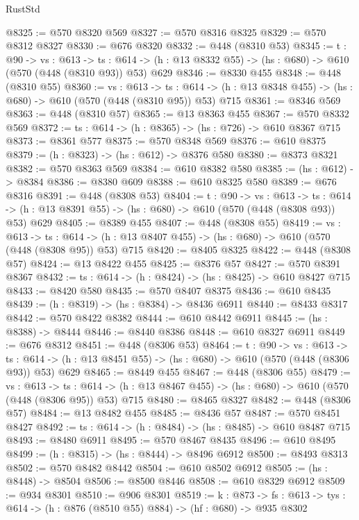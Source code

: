 \begin{lexlean}{RustStd}
\begin{coremodule}
@8325 := @570 @8320 @569
@8327 := @570 @8316 @8325
@8329 := @570 @8312 @8327
@8330 := @676 @8320
@8332 := @448 (@8310 @53)
@8345 := {t : @90} ->
  {vs : @613} ->
  {ts : @614} -> (h : @13 @8332 @55) -> (hs : @680) -> @610 (@570 (@448 (@8310 @93)) @53) @629
@8346 := @8330 @455
@8348 := @448 (@8310 @55)
@8360 := {vs : @613} ->
  {ts : @614} -> (h : @13 @8348 @455) -> (hs : @680) -> @610 (@570 (@448 (@8310 @95)) @53) @715
@8361 := @8346 @569
@8363 := @448 (@8310 @57)
@8365 := @13 @8363 @455
@8367 := @570 @8332 @569
@8372 := {ts : @614} -> (h : @8365) -> (hs : @726) -> @610 @8367 @715
@8373 := @8361 @577
@8375 := @570 @8348 @569
@8376 := @610 @8375
@8379 := (h : @8323) -> (hs : @612) -> @8376 @580
@8380 := @8373 @8321
@8382 := @570 @8363 @569
@8384 := @610 @8382 @580
@8385 := (hs : @612) -> @8384
@8386 := @8380 @609
@8388 := @610 @8325 @580
@8389 := @676 @8316
@8391 := @448 (@8308 @53)
@8404 := {t : @90} ->
  {vs : @613} ->
  {ts : @614} -> (h : @13 @8391 @55) -> (hs : @680) -> @610 (@570 (@448 (@8308 @93)) @53) @629
@8405 := @8389 @455
@8407 := @448 (@8308 @55)
@8419 := {vs : @613} ->
  {ts : @614} -> (h : @13 @8407 @455) -> (hs : @680) -> @610 (@570 (@448 (@8308 @95)) @53) @715
@8420 := @8405 @8325
@8422 := @448 (@8308 @57)
@8424 := @13 @8422 @455
@8425 := @8376 @57
@8427 := @570 @8391 @8367
@8432 := {ts : @614} -> (h : @8424) -> (hs : @8425) -> @610 @8427 @715
@8433 := @8420 @580
@8435 := @570 @8407 @8375
@8436 := @610 @8435
@8439 := (h : @8319) -> (hs : @8384) -> @8436 @6911
@8440 := @8433 @8317
@8442 := @570 @8422 @8382
@8444 := @610 @8442 @6911
@8445 := (hs : @8388) -> @8444
@8446 := @8440 @8386
@8448 := @610 @8327 @6911
@8449 := @676 @8312
@8451 := @448 (@8306 @53)
@8464 := {t : @90} ->
  {vs : @613} ->
  {ts : @614} -> (h : @13 @8451 @55) -> (hs : @680) -> @610 (@570 (@448 (@8306 @93)) @53) @629
@8465 := @8449 @455
@8467 := @448 (@8306 @55)
@8479 := {vs : @613} ->
  {ts : @614} -> (h : @13 @8467 @455) -> (hs : @680) -> @610 (@570 (@448 (@8306 @95)) @53) @715
@8480 := @8465 @8327
@8482 := @448 (@8306 @57)
@8484 := @13 @8482 @455
@8485 := @8436 @57
@8487 := @570 @8451 @8427
@8492 := {ts : @614} -> (h : @8484) -> (hs : @8485) -> @610 @8487 @715
@8493 := @8480 @6911
@8495 := @570 @8467 @8435
@8496 := @610 @8495
@8499 := (h : @8315) -> (hs : @8444) -> @8496 @6912
@8500 := @8493 @8313
@8502 := @570 @8482 @8442
@8504 := @610 @8502 @6912
@8505 := (hs : @8448) -> @8504
@8506 := @8500 @8446
@8508 := @610 @8329 @6912
@8509 := @934 @8301
@8510 := @906 @8301
@8519 := {k : @873} ->
  {fs : @613} -> {tys : @614} -> (h : @876 (@8510 @55) @884) -> (hf : @680) -> @935 @8302

\end{coremodule}
\end{lexlean}
